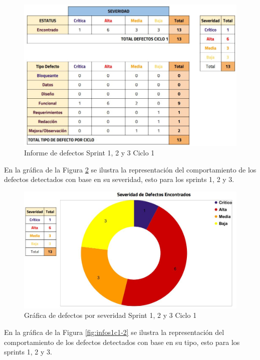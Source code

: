 \begin{figure}[H]
	\begin{center}
		\includegraphics[width=.95\textwidth]{images/pruebas/s1c1}
		\caption{Informe de defectos Sprint 1, 2 y 3 Ciclo 1}
		\label{fig:infos1c1}
	\end{center}
\end{figure}

\newpage

En la gráfica de la Figura \ref{fig:infos1c1-1} se ilustra la representación del comportamiento de los defectos detectados con base en su severidad, esto para los sprints 1, 2 y 3.

\begin{figure}[H]
	\begin{center}
		\includegraphics[width=.75\textwidth]{images/pruebas/s1c1-1}
		\caption{Gráfica de defectos por severidad Sprint 1, 2 y 3 Ciclo 1}
		\label{fig:infos1c1-1}
	\end{center}
\end{figure}

En la gráfica de la Figura \ref{fig:infos1c1-2} se ilustra la representación del comportamiento de los defectos detectados con base en su tipo, esto para los sprints 1, 2 y 3.


